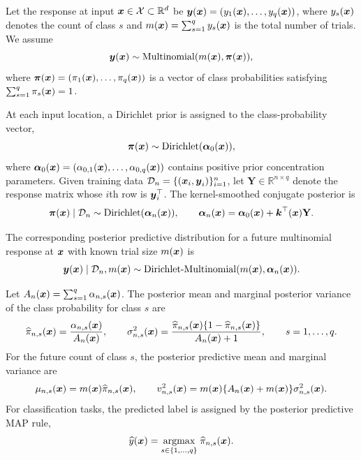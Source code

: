 \documentclass[article, shortnames]{jss}
\renewcommand{\vec}[1]{\mbox{\boldmath ${#1}$}}
\def\argmax{\mbox{\rm argmax}}
\begin{document}
Let the response at input $\vec{x}\in\mathcal{X}\subset\mathbb{R}^d$ be 
$\vec{y}(\vec{x})=(y_1(\vec{x}),\ldots,y_q(\vec{x}))$, where $y_s(\vec{x})$ denotes the count of class $s$ and $m(\vec{x})=\sum_{s=1}^q y_s(\vec{x})$ is the total number of trials. 
We assume
\[
\vec{y}(\vec{x}) \sim \mathrm{Multinomial}(m(\vec{x}),\vec{\pi}(\vec{x})),
\]
where $\vec{\pi}(\vec{x})=(\pi_1(\vec{x}),\ldots,\pi_q(\vec{x}))$ is a vector of class probabilities satisfying $\sum_{s=1}^q\pi_s(\vec{x})=1$.

At each input location, a Dirichlet prior is assigned to the class-probability vector,
\[
\vec{\pi}(\vec{x})\sim\mathrm{Dirichlet}(\vec{\alpha}_0(\vec{x})),
\]
where $\vec{\alpha}_0(\vec{x})=(\alpha_{0,1}(\vec{x}),\ldots,\alpha_{0,q}(\vec{x}))$ contains positive prior concentration parameters. 
Given training data $\mathcal{D}_n=\{(\vec{x}_i,\vec{y}_i)\}_{i=1}^n$, let $\mathbf{Y}\in\mathbb{R}^{n\times q}$ denote the response matrix whose $i$th row is $\vec{y}_i^\top$. 
The kernel-smoothed conjugate posterior is
\begin{equation}\label{eq:DKP_model}
	\vec{\pi}(\vec{x}) \mid \mathcal{D}_n 
	\sim 
	\mathrm{Dirichlet}(\vec{\alpha}_n(\vec{x})),
	\qquad
	\vec{\alpha}_n(\vec{x}) 
	= \vec{\alpha}_0(\vec{x}) + \vec{k}^{\top}(\vec{x})\mathbf{Y}.
\end{equation}

The corresponding posterior predictive distribution for a future multinomial response at $\vec{x}$ with known trial size $m(\vec{x})$ is
\begin{equation}\label{eq:DKP_predictive_count}
	\vec{y}(\vec{x}) \mid \mathcal{D}_n, m(\vec{x})
	\sim
	\mathrm{Dirichlet\mbox{-}Multinomial}
	(m(\vec{x}), \vec{\alpha}_n(\vec{x})).
\end{equation}

Let $A_n(\vec{x})=\sum_{s=1}^q\alpha_{n,s}(\vec{x})$. 
The posterior mean and marginal posterior variance of the class probability for class $s$ are
\[
\widehat{\pi}_{n,s}(\vec{x}) 
= \frac{\alpha_{n,s}(\vec{x})}{A_n(\vec{x})},
\qquad
\sigma^2_{n,s}(\vec{x}) 
= \frac{\widehat{\pi}_{n,s}(\vec{x})\{1-\widehat{\pi}_{n,s}(\vec{x})\}}
{A_n(\vec{x})+1},
\qquad s=1,\ldots,q.
\]
For the future count of class $s$, the posterior predictive mean and marginal variance are
\[
\mu_{n,s}(\vec{x}) 
= m(\vec{x})\widehat{\pi}_{n,s}(\vec{x}),
\qquad
v^2_{n,s}(\vec{x}) 
= m(\vec{x})\{A_n(\vec{x})+m(\vec{x})\}\sigma^2_{n,s}(\vec{x}).
\]
For classification tasks, the predicted label is assigned by the posterior predictive MAP rule,
\begin{equation}\label{eq:class_cri_DKP}
	\widehat{y}(\vec{x}) 
	= \underset{s\in\{1,\ldots,q\}}{\argmax}\; 
	\widehat{\pi}_{n,s}(\vec{x}).
\end{equation}
\end{document}
